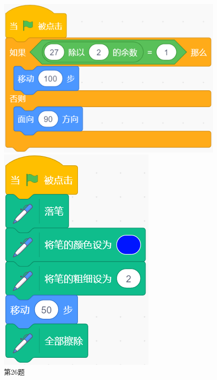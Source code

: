 \documentclass[10pt, a4paper]{article}
\begin{document}
\begin{enumerate}
        \begin{figure}[htbp]
            \centering
            \begin{minipage}[t]{.24\textwidth}
                \centering
                \includegraphics[width=\textwidth]{26.png}
                \caption*{第26题}
            \end{minipage}
            \begin{minipage}[t]{.12\textwidth}
                \centering
                \includegraphics[width=\textwidth]{29.png}

\end{minipage}
\end{figure}
\end{enumerate}
\end{document}
